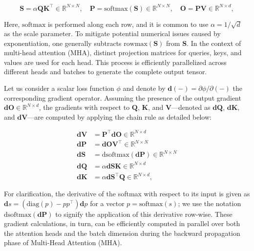 \begin{equation*}
  \mathbf{S} = \alpha \mathbf{Q} \mathbf{K}^\top \in \mathbb{R}^{N \times N}, \quad \mathbf{P} = \mathrm{softmax}(\mathbf{S}) \in \mathbb{R}^{N \times N}, \quad \mathbf{O} = \mathbf{P}\mathbf{V} \in \mathbb{R}^{N \times d},
\end{equation*}

Here, $\mathrm{softmax}$ is performed along each row, and it is common to use $\alpha = 1/\sqrt{d}$ as the scale parameter. To mitigate potential numerical issues caused by exponentiation, one generally subtracts $\mathrm{rowmax}(\mathbf{S})$ from $\mathbf{S}$. In the context of multi-head attention (MHA), distinct projection matrices for queries, keys, and values are used for each head. This process is efficiently parallelized across different heads and batches to generate the complete output tensor.

Let us consider a scalar loss function $\phi$ and denote by $\mathbf{d}(-) = \partial \phi / \partial (-)$ the corresponding gradient operator. Assuming the presence of the output gradient $\mathbf{dO} \in \mathbb{R}^{N \times d}$, the gradients with respect to $\mathbf{Q}$, $\mathbf{K}$, and $\mathbf{V}$—denoted as $\mathbf{dQ}$, $\mathbf{dK}$, and $\mathbf{dV}$—are computed by applying the chain rule as detailed below:

\begin{align*}
  \mathbf{dV} &= \mathbf{P}^\top \mathbf{dO} \in \mathbb{R}^{N \times d} \\
  \mathbf{dP} &= \mathbf{dO} \mathbf{V}^\top \in \mathbb{R}^{N \times N} \\
  \mathbf{dS} &= \mathrm{dsoftmax}(\mathbf{dP}) \in \mathbb{R}^{N \times N} \\
  \mathbf{dQ} &= \alpha \mathbf{dS} \mathbf{K} \in \mathbb{R}^{N \times d} \\
  \mathbf{dK} &= \alpha \mathbf{dS}^\top \mathbf{Q} \in \mathbb{R}^{N \times d},
\end{align*}

For clarification, the derivative of the softmax with respect to its input is given as $\mathbf{d}s = (\mathrm{diag}(p) - p p^\top)\mathbf{d}p$ for a vector $p = \mathrm{softmax}(s)$; we use the notation $\mathrm{dsoftmax}(\mathbf{dP})$ to signify the application of this derivative row-wise. These gradient calculations, in turn, can be efficiently computed in parallel over both the attention heads and the batch dimension during the backward propagation phase of Multi-Head Attention (MHA).

